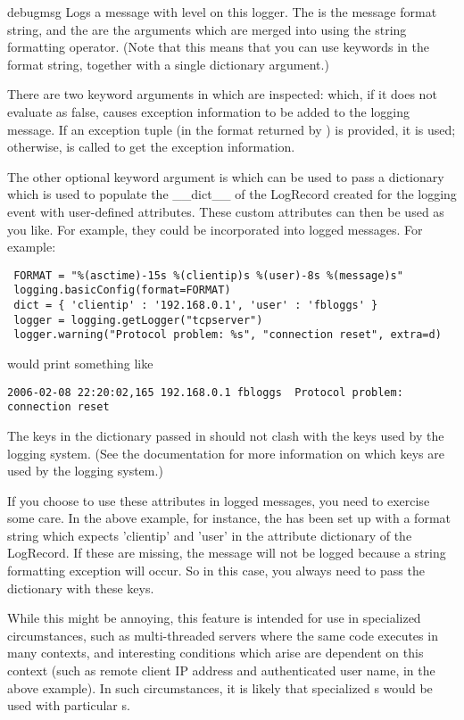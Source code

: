 \begin{methoddesc}{debug}{msg}
Logs a message with level  on this logger.
The  is the message format string, and the  are the
arguments which are merged into  using the string formatting
operator. (Note that this means that you can use keywords in the
format string, together with a single dictionary argument.)

There are two keyword arguments in  which are inspected:
 which, if it does not evaluate as false, causes exception
information to be added to the logging message. If an exception tuple (in the
format returned by ) is provided, it is used;
otherwise,  is called to get the exception
information.

The other optional keyword argument is  which can be used to pass
a dictionary which is used to populate the __dict__ of the LogRecord created
for the logging event with user-defined attributes. These custom attributes
can then be used as you like. For example, they could be incorporated into
logged messages. For example:

\begin{verbatim}
 FORMAT = "%(asctime)-15s %(clientip)s %(user)-8s %(message)s"
 logging.basicConfig(format=FORMAT)
 dict = { 'clientip' : '192.168.0.1', 'user' : 'fbloggs' }
 logger = logging.getLogger("tcpserver")
 logger.warning("Protocol problem: %s", "connection reset", extra=d)
\end{verbatim}

would print something like
\begin{verbatim}
2006-02-08 22:20:02,165 192.168.0.1 fbloggs  Protocol problem: connection reset
\end{verbatim}

The keys in the dictionary passed in  should not clash with the keys
used by the logging system. (See the  documentation for more
information on which keys are used by the logging system.)

If you choose to use these attributes in logged messages, you need to exercise
some care. In the above example, for instance, the  has been
set up with a format string which expects 'clientip' and 'user' in the
attribute dictionary of the LogRecord. If these are missing, the message will
not be logged because a string formatting exception will occur. So in this
case, you always need to pass the  dictionary with these keys.

While this might be annoying, this feature is intended for use in specialized
circumstances, such as multi-threaded servers where the same code executes
in many contexts, and interesting conditions which arise are dependent on this
context (such as remote client IP address and authenticated user name, in the
above example). In such circumstances, it is likely that specialized
s would be used with particular s.
\end{methoddesc}


